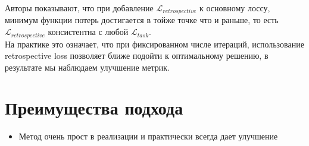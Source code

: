 Авторы показывают, что при добавление $\mathcal{L}_{retrospective}$ к основному лоссу, минимум функции потерь достигается в тойже точке что и раньше, то есть $\mathcal{L}_{retrospective}$ консистентна с любой $\mathcal{L}_{task}$. \\

На практике это означает, что при фиксированном числе итераций, использование retrospective loss позволяет ближе подойти к оптимальному решению, в результате мы наблюдаем улучшение метрик.

\section{Преимущества подхода}

\begin{itemize}
    \item Метод очень прост в реализации и практически всегда дает улучшение
\end{itemize}